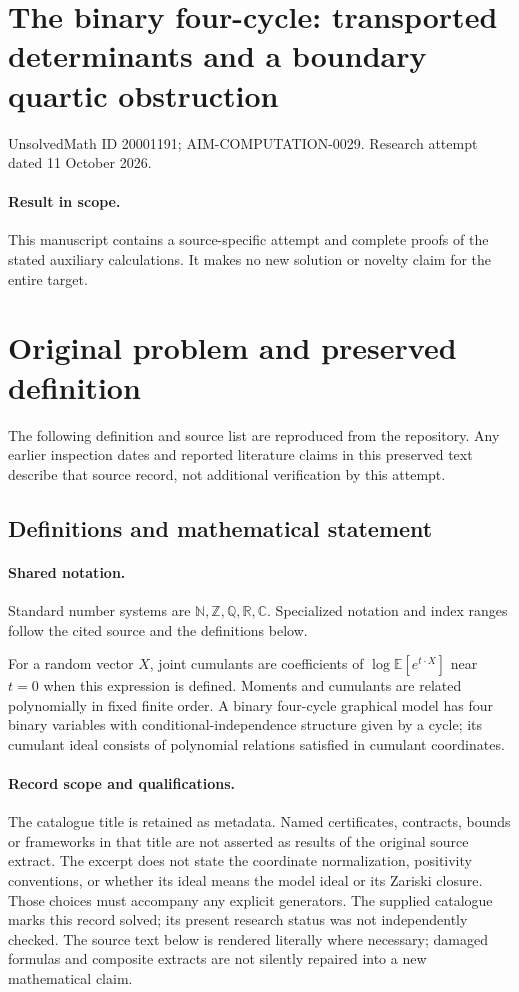 \documentclass[11pt]{article}
\begin{document}
\section*{The binary four-cycle: transported determinants and a boundary quartic obstruction}
\noindent UnsolvedMath ID 20001191; AIM-COMPUTATION-0029. Research attempt dated 11 October 2026.
\paragraph{Result in scope.}This manuscript contains a source-specific attempt and complete proofs of the stated auxiliary calculations. It makes no new solution or novelty claim for the entire target.
\section{Original problem and preserved definition}
The following definition and source list are reproduced from the repository. Any earlier inspection dates and reported literature claims in this preserved text describe that source record, not additional verification by this attempt.
\subsection{Definitions and mathematical statement}

\paragraph{Shared notation.}Standard number systems are $\mathbb N,\mathbb Z,\mathbb Q,\mathbb R,\mathbb C$. Specialized notation and index ranges follow the cited source and the definitions below.


For a random vector $X$, joint cumulants are coefficients of $\log\mathbb E[e^{t\cdot X}]$ near $t=0$ when this expression is defined. Moments and cumulants are related polynomially in fixed finite order. A binary four-cycle graphical model has four binary variables with conditional-independence structure given by a cycle; its cumulant ideal consists of polynomial relations satisfied in cumulant coordinates.
\paragraph{Record scope and qualifications.}
The catalogue title is retained as metadata. Named certificates, contracts, bounds or frameworks in that title are not asserted as results of the original source extract.
The excerpt does not state the coordinate normalization, positivity conventions, or whether its ideal means the model ideal or its Zariski closure. Those choices must accompany any explicit generators. The supplied catalogue marks this record solved; its present research status was not independently checked.
The source text below is rendered literally where necessary; damaged formulas and composite extracts are not silently repaired into a new mathematical claim.
\end{document}
